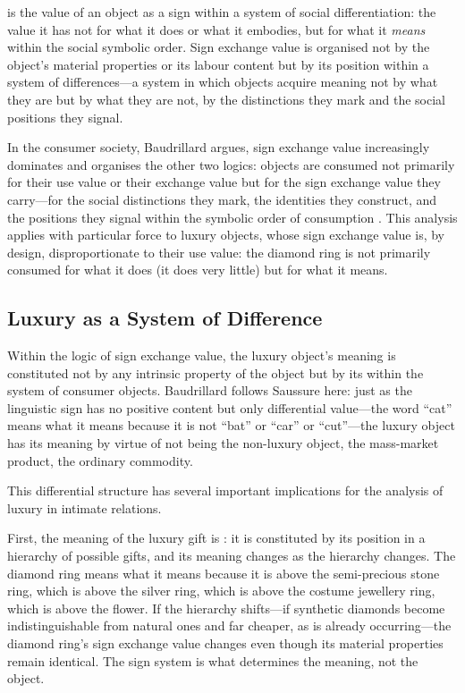  is the value of an object as a sign within a system of social differentiation: the value it has not for what it does or what it embodies, but for what it \emph{means} within the social symbolic order. Sign exchange value is organised not by the object's material properties or its labour content but by its position within a system of differences---a system in which objects acquire meaning not by what they are but by what they are not, by the distinctions they mark and the social positions they signal.

In the consumer society, Baudrillard argues, sign exchange value increasingly dominates and organises the other two logics: objects are consumed not primarily for their use value or their exchange value but for the sign exchange value they carry---for the social distinctions they mark, the identities they construct, and the positions they signal within the symbolic order of consumption \parencite{baudrillard1998}. This analysis applies with particular force to luxury objects, whose sign exchange value is, by design, disproportionate to their use value: the diamond ring is not primarily consumed for what it does (it does very little) but for what it means.

\subsection{Luxury as a System of Difference}
\label{p16:subsec:difference}

\noindent
Within the logic of sign exchange value, the luxury object's meaning is constituted not by any intrinsic property of the object but by its  within the system of consumer objects. Baudrillard follows Saussure here: just as the linguistic sign has no positive content but only differential value---the word ``cat'' means what it means because it is not ``bat'' or ``car'' or ``cut''---the luxury object has its meaning by virtue of not being the non-luxury object, the mass-market product, the ordinary commodity.

This differential structure has several important implications for the analysis of luxury in intimate relations.

First, the meaning of the luxury gift is : it is constituted by its position in a hierarchy of possible gifts, and its meaning changes as the hierarchy changes. The diamond ring means what it means because it is above the semi-precious stone ring, which is above the silver ring, which is above the costume jewellery ring, which is above the flower. If the hierarchy shifts---if synthetic diamonds become indistinguishable from natural ones and far cheaper, as is already occurring---the diamond ring's sign exchange value changes even though its material properties remain identical. The sign system is what determines the meaning, not the object.

